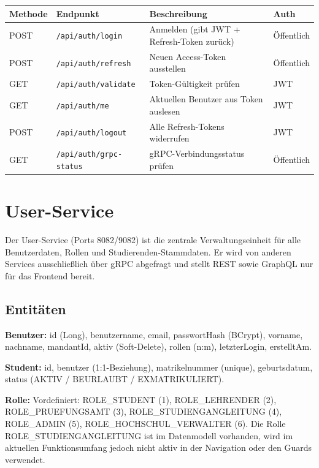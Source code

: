 \documentclass[12pt,a4paper,ngerman]{article}
\begin{document}
\begin{table}[H]
\centering
\begin{tabular}{llL{5cm}l}
\toprule
\textbf{Methode} & \textbf{Endpunkt} & \textbf{Beschreibung} & \textbf{Auth} \\
\midrule
POST & \texttt{/api/auth/login}       & Anmelden (gibt JWT + Refresh-Token zurück) & Öffentlich \\
POST & \texttt{/api/auth/refresh}     & Neuen Access-Token ausstellen              & Öffentlich \\
GET  & \texttt{/api/auth/validate}    & Token-Gültigkeit prüfen                    & JWT \\
GET  & \texttt{/api/auth/me}          & Aktuellen Benutzer aus Token auslesen      & JWT \\
POST & \texttt{/api/auth/logout}      & Alle Refresh-Tokens widerrufen             & JWT \\
GET  & \texttt{/api/auth/grpc-status} & gRPC-Verbindungsstatus prüfen              & Öffentlich \\
\bottomrule
\end{tabular}
\end{table}

\section{User-Service}

Der User-Service (Ports 8082/9082) ist die zentrale Verwaltungseinheit für alle Benutzerdaten, Rollen und Studierenden-Stammdaten. Er wird von anderen Services ausschließlich über gRPC abgefragt und stellt REST sowie GraphQL nur für das Frontend bereit.

\subsection{Entitäten}

\textbf{Benutzer:} id (Long), benutzername, email, passwortHash (BCrypt), vorname, nachname, mandantId, aktiv (Soft-Delete), rollen (n:m), letzterLogin, erstelltAm.

\textbf{Student:} id, benutzer (1:1-Beziehung), matrikelnummer (unique), geburtsdatum, status (AKTIV / BEURLAUBT / EXMATRIKULIERT).

\textbf{Rolle:} Vordefiniert: ROLE\_STUDENT (1), ROLE\_LEHRENDER (2), ROLE\_PRUEFUNGSAMT (3), ROLE\_STUDIENGANGLEITUNG (4), ROLE\_ADMIN (5), ROLE\_HOCHSCHUL\_VERWALTER (6). Die Rolle ROLE\_STUDIENGANGLEITUNG ist im Datenmodell vorhanden, wird im aktuellen Funktionsumfang jedoch nicht aktiv in der Navigation oder den Guards verwendet.
\end{document}
